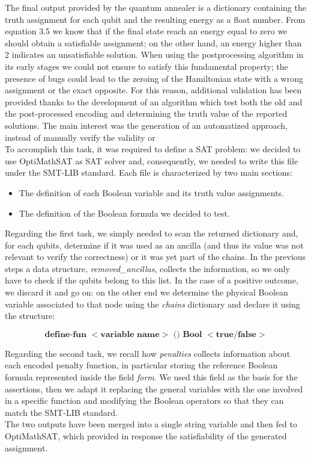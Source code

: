 The final output provided by the quantum annealer is a dictionary containing the truth assignment for each qubit and the resulting energy as a float number. From equation 3.5 we know that if the final state reach an energy equal to zero we should obtain a satisfiable assignment; on the other hand, an energy higher than 2 indicates an unsatisfiable solution. When using the postprocessing algorithm in its early stages we could not ensure to satisfy this fundamental property; the presence of bugs could lead to the zeroing of the Hamiltonian state with a wrong assignment or the exact opposite. For this reason, additional validation has been provided thanks to the development of an algorithm which test both the old and the post-processed encoding and determining the truth value of the reported solutions. The main interest was the generation of an automatized approach, instead of manually verify the validity or \\
To accomplish this task, it was required to define a SAT problem: we decided to use OptiMathSAT as SAT solver and, consequently, we needed to write this file under the SMT-LIB standard. Each file is characterized by two main sections:

\begin{itemize}
    \item The definition of each Boolean variable and its truth value assignments.
    \item The definition of the Boolean formula we decided to test.
\end{itemize}

Regarding the first task, we simply needed to scan the returned dictionary and, for each qubits, determine if it was used as an ancilla (and thus its value was not relevant to verify the correctness) or it was yet part of the chains. In the previous steps a data structure, \textit{removed\_ancillas}, 
collects the information, so we only have to check if the qubits belong to this list. In the case of a positive outcome, we discard it and go on: on the other end we determine the physical Boolean variable associated to that node using the \textit{chains} dictionary and declare it using the structure:

\begin{equation*}
    \textbf{define-fun $<$variable name$>$ () Bool $<$true/false$>$}
\end{equation*}

Regarding the second task, we recall how \textit{penalties} collects information about each encoded penalty function, in particular storing the reference Boolean formula represented inside the field \textit{form}. We used this field as the basis for the assertions, then we adapt it replacing the general variables with the one involved in a specific function and modifying the Boolean operators so that they can match the SMT-LIB standard. \\
The two outputs have been merged into a single string variable and then fed to OptiMathSAT, which provided in response the satisfiability of the generated assignment.

\newpage


